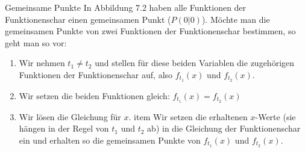\begin{bla}{Gemeinsame Punkte}
  In Abbildung 7.2 haben alle Funktionen der Funktionenschar einen gemeinsamen Punkt ($P(0|0)$).
  Möchte man die gemeinsamen Punkte von zwei Funktionen der Funktionenschar bestimmen, so geht man so vor:
  \begin{enumerate}
    \item Wir nehmen $t_1 \neq t_2$ und stellen für diese beiden Variablen die zugehörigen Funktionen der Funktionenschar auf, also $f_{t_1}(x)$ und $f_{t_2}(x)$.
    \item Wir setzen die beiden Funktionen gleich: $f_{t_1}(x)=f_{t_2}(x)$
    \item Wir lösen die Gleichung für $x$.
    item Wir setzen die erhaltenen $x$-Werte (sie hängen in der Regel von $t_1$ und $t_2$ ab) in die Gleichung der Funktionenschar ein und erhalten so die gemeinsamen Punkte von $f_{t_1}(x)$ und $f_{t_2}(x)$.
  \end{enumerate}
\end{bla}
